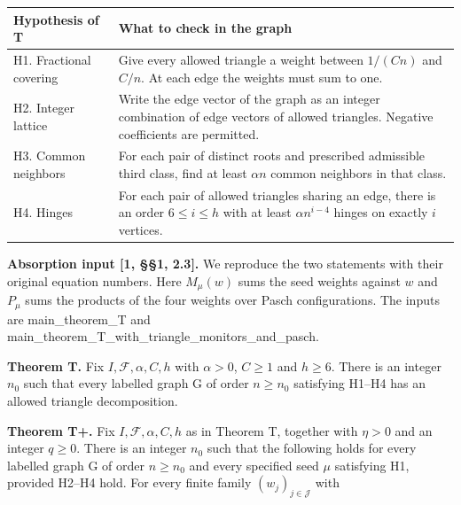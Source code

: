\documentclass[english,11pt,a4paper]{article}
\begin{document}
{\begin{longtable}[]{@{}
  >{\raggedright\arraybackslash}p{}
  >{\raggedright\arraybackslash}p{}@{}}
\toprule\noalign{}
\begin{minipage}[b]{\linewidth}\raggedright
Hypothesis of T
\end{minipage} & \begin{minipage}[b]{\linewidth}\raggedright
What to check in the graph
\end{minipage} \\
\midrule\noalign{}
\endhead
\bottomrule\noalign{}
\endlastfoot
H1. Fractional covering & Give every allowed triangle a weight between \(1/(Cn)\) and \(C/n\). At each edge the weights must sum to one. \\
H2. Integer lattice & Write the edge vector of the graph as an integer combination of edge vectors of allowed triangles. Negative coefficients are permitted. \\
H3. Common neighbors & For each pair of distinct roots and prescribed admissible third class, find at least \(\alpha n\) common neighbors in that class. \\
H4. Hinges & For each pair of allowed triangles sharing an edge, there is an order \(6\le i\le h\) with at least \(\alpha n^{i-4}\) hinges on exactly \(i\) vertices. \\
\end{longtable}
}

\textbf{Absorption input {[}1, §§1, 2.3{]}.} We reproduce the two statements with their original equation numbers. Here \(M_\mu(w)\) sums the seed weights against \(w\) and \(P_\mu\) sums the products of the four weights over Pasch configurations. The inputs are main\_theorem\_T and main\_theorem\_T\_with\_triangle\_monitors\_and\_pasch.

\textbf{Theorem T.} Fix \(I,\mathcal F,\alpha,C,h\) with \(\alpha>0\), \(C\geq1\) and \(h\geq6\). There is an integer \(n_0\) such that every labelled graph G of order \(n\geq n_0\) satisfying H1--H4 has an allowed triangle decomposition.

\textbf{Theorem T+.} Fix \(I,\mathcal F,\alpha,C,h\) as in Theorem T, together with \(\eta>0\) and an integer \(q\geq0\). There is an integer \(n_0\) such that the following holds for every labelled graph G of order \(n\geq n_0\) and every specified seed \(\mu\) satisfying H1, provided H2--H4 hold. For every finite family \((w_j)_{j\in\mathcal J}\) with
\end{document}
